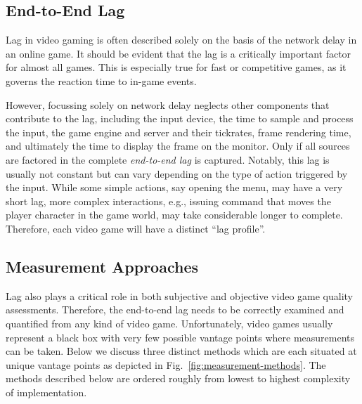 \subsection{End-to-End Lag}
\label{sec:e2e-lag}

Lag in video gaming is often described solely on the basis of the network delay in an online game. It should be evident that the lag is a critically important factor for almost all games. This is especially true for fast or competitive games, as it governs the reaction time to in-game events.

However, focussing solely on network delay neglects other components that contribute to the lag, including the input device, the time to sample and process the input, the game engine and server and their tickrates, frame rendering time, and ultimately the time to display the frame on the monitor. Only if all sources are factored in the complete \textit{end-to-end lag} is captured. Notably, this lag is usually not constant but can vary depending on the type of action triggered by the input. While some simple actions, say opening the menu, may have a very short lag, more complex interactions, e.g., issuing command that moves the player character in the game world, may take considerable longer to complete. %
Therefore, each video game will have a distinct ``lag profile''.




\subsection{Measurement Approaches}
\label{sec:measurementapproaches}

Lag also plays a critical role in both subjective and objective video game quality assessments. Therefore, the end-to-end lag needs to be correctly examined and quantified from any kind of video game. Unfortunately, video games usually represent a black box with very few possible vantage points where measurements can be taken. Below we discuss three distinct methods which are each situated at unique vantage points as depicted in Fig.~\ref{fig:measurement-methods}.
The methods described below are ordered roughly from lowest to highest complexity of implementation.

